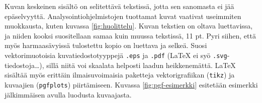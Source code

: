 Kuvan keskeinen sisältö on selitettävä tekstissä, jotta sen sanomasta ei jää epäselvyyttä. Analysointiohjelmistojen tuottamat kuvat vaativat useimmiten muokkausta, kuten kuvassa \ref{fig:huolittelu}. Kuvan tekstien on oltava luettavissa, ja niiden kooksi suositellaan samaa kuin muussa tekstissä, 11 pt. Pyri siihen, että myös harmaasävyissä tulostettu kopio on luettava ja selkeä. Suosi vektorimuotoisia kuvatiedostotyyppejä \texttt{.eps} ja \texttt{.pdf} (\LaTeX{} ei syö \texttt{.svg}-tiedostoja\ldots), sillä niitä voi skaalata helposti laadun heikkenemättä. \LaTeX{} sisältää myös erittäin ilmaisuvoimaisia paketteja vektorigrafiikan (\texttt{tikz}) \parencite{tikz} ja kuvaajien (\texttt{pgfplots}) \parencite{pgfplots} piirtämiseen. Kuvassa \ref{fig:pgf-esimerkki} esitetään esimerkki jälkimmäisen avulla luodusta kuvaajasta.


